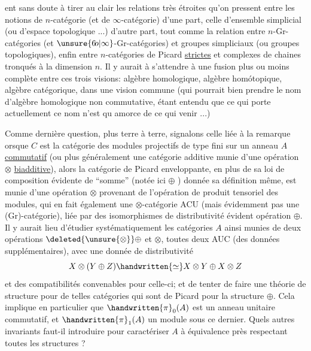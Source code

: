 
ent sans doute à tirer au clair les relations très étroites qu'on pressent entre les notions de $n$-catégorie (et de $\infty$-catégorie) d'une part, celle d'ensemble simplicial (ou d'espace topologique ...) d'autre part, tout comme la relation entre $n$-Gr-catégories (et $\unsure{6\!o|\infty}$-Gr-catégories) et groupes simpliciaux (ou groupes topologiques), enfin entre  $n$-catégories de Picard \uline{strictes} et  complexes de chaines tronqués à la dimension $n$. Il y aurait à s'attendre à une fusion plus ou moins complète entre ces trois visions: algèbre homologique, algèbre homótopique, algèbre catégorique, dans une vision commune (qui pourrait bien prendre le nom d'algèbre homologique non commutative, étant entendu que ce qui porte actuellement ce nom n'est qu amorce  de ce qui  venir ...)

Comme dernière question, plus terre à terre, signalons celle liée à la remarque  orsque  $C$ est la catégorie des modules projectifs de type fini sur un anneau $A$ \uline{commutatif} (ou plus généralement une catégorie additive munie d'une opération $\otimes$  \uline{biadditive}), alors la catégorie de Picard enveloppante, en plus de sa loi de composition évidente de ``somme'' (notée ici $\oplus$ ) donnée  sa définition même, est munie d'une opération $\otimes$ provenant de l'opération de produit tensoriel  des modules, qui en fait également une $\otimes$-catégorie ACU (mais évidemment pas une (Gr)-catégorie), liée par des isomorphismes de distributivité évident opération $\oplus$. Il y aurait lieu d'étudier systématiquement les catégories $A$ ainsi munies de deux opérations $\deleted{\unsure{\otimes}}\oplus$ et $\otimes$, toutes deux AUC (des données supplémentaires), avec une donnée de distributivité
\[
X\otimes(Y\oplus Z)\handwritten{\simeq}X\otimes Y\oplus X\otimes Z
\]
et des compatibilités convenables pour celle-ci; et de tenter de faire une théorie de structure pour de telles catégories qui sont de  Picard pour la structure $\oplus$. Cela implique en particulier que $\handwritten{\pi}_0(A)$ est un anneau unitaire commutatif, et $\handwritten{\pi}_1(A)$ un module sous ce dernier. Quels autres invariants faut-il introduire pour caractériser $A$ à équivalence près respectant toutes les structures ?
